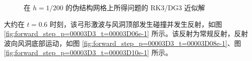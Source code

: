 \begin{figure}[h!]
\begin{centering}
\par\end{centering}
\begin{centering}
\par\end{centering}
\caption{\label{fig:forward_step_p=00003D3}在 $h=1/200$ 的伪结构网格上所得问题的
RK3/DG3 近似解}
\end{figure}

大约在 $t=0.6$ 时刻，该弓形激波与风洞顶部发生碰撞并发生反射，如图 \ref{fig:forward_step_p=00003D3_t=00003D06e-1}
所示。该反射为常规反射，反射波向风洞底部运动，如图 \ref{fig:forward_step_p=00003D3_t=00003D08e-1}、图
\ref{fig:forward_step_p=00003D3_t=00003D10e-1} 所示。

